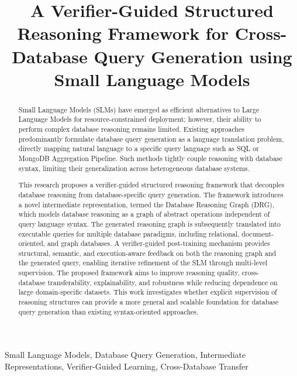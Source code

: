 \documentclass[conference]{IEEEtran}
\begin{document}
\title{A Verifier-Guided Structured Reasoning Framework for Cross-Database Query Generation using Small Language Models}

\author{
}

\maketitle

\begin{abstract}
Small Language Models (SLMs) have emerged as efficient alternatives to Large Language Models for resource-constrained deployment; however, their ability to perform complex database reasoning remains limited. Existing approaches predominantly formulate database query generation as a language translation problem, directly mapping natural language to a specific query language such as SQL or MongoDB Aggregation Pipeline. Such methods tightly couple reasoning with database syntax, limiting their generalization across heterogeneous database systems.

This research proposes a verifier-guided structured reasoning framework that decouples database reasoning from database-specific query generation. The framework introduces a novel intermediate representation, termed the Database Reasoning Graph (DRG), which models database reasoning as a graph of abstract operations independent of query language syntax. The generated reasoning graph is subsequently translated into executable queries for multiple database paradigms, including relational, document-oriented, and graph databases. A verifier-guided post-training mechanism provides structural, semantic, and execution-aware feedback on both the reasoning graph and the generated query, enabling iterative refinement of the SLM through multi-level supervision. The proposed framework aims to improve reasoning quality, cross-database transferability, explainability, and robustness while reducing dependence on large domain-specific datasets. This work investigates whether explicit supervision of reasoning structures can provide a more general and scalable foundation for database query generation than existing syntax-oriented approaches.
\end{abstract}

\begin{IEEEkeywords}
Small Language Models, Database Query Generation, Intermediate Representations, Verifier-Guided Learning, Cross-Database Transfer
\end{IEEEkeywords}
\end{document}
